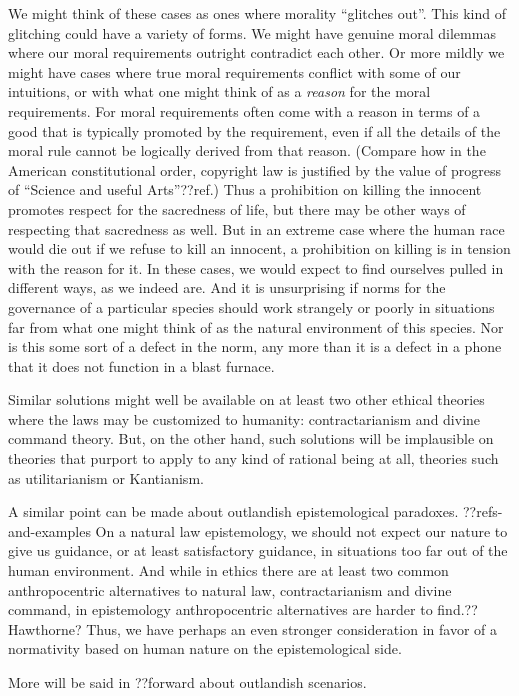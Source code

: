 We might think of these cases as ones where morality ``glitches out''. This kind of glitching could have a variety
of forms. We might have genuine moral dilemmas where our moral requirements outright contradict each other. Or more
mildly we might have cases where true moral requirements conflict with some of our intuitions, or with what one might think of as a
\textit{reason} for the moral requirements. For moral requirements often come with a reason in terms of a good that
is typically promoted by the requirement, even if all the details of the moral rule cannot be logically derived from that reason.
(Compare how in the American constitutional order, copyright law is justified by the value of progress 
of ``Science and useful Arts''??ref.) Thus a prohibition on killing the innocent promotes respect for the sacredness of life,
but there may be other ways of respecting that sacredness as well. But in an extreme case where the human race would die out
if we refuse to kill an innocent, a prohibition on killing is in tension with the reason for it. In these cases, we would
expect to find ourselves pulled in different ways, as we indeed are. And it is unsurprising if norms for the governance of
a particular species should work strangely or poorly in situations far from what one might think of as the natural environment 
of this species. Nor is this some sort of a defect in the norm, any more than it is a defect in a phone that it does not
function in a blast furnace.

Similar solutions might well be available on at least two other ethical theories where the laws may be customized
to humanity: contractarianism and divine command theory. But, on the other hand, such solutions will be
implausible on theories that purport to apply to any kind of rational being at all, theories such as utilitarianism
or Kantianism. 

A similar point can be made about outlandish epistemological paradoxes. ??refs-and-examples  On a natural law epistemology, we should not expect our nature to give us guidance, or at least satisfactory guidance, 
in situations too far out of the human environment. And while in ethics there are at least two common anthropocentric alternatives to natural law, contractarianism and divine command, in epistemology anthropocentric alternatives are harder to find.??Hawthorne?
Thus, we have perhaps an even stronger consideration in favor of a normativity based on human nature on the epistemological
side. 

More will be said in ??forward about outlandish scenarios.

